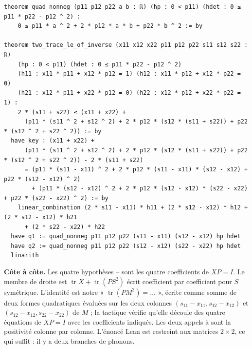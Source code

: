 \begin{leanbox}
\begin{lstlisting}[style=chIIIlean]
theorem quad_nonneg (p11 p12 p22 a b : ℝ) (hp : 0 < p11) (hdet : 0 ≤ p11 * p22 - p12 ^ 2) :
    0 ≤ p11 * a ^ 2 + 2 * p12 * a * b + p22 * b ^ 2 := by

theorem two_trace_le_of_inverse (x11 x12 x22 p11 p12 p22 s11 s12 s22 : ℝ)
    (hp : 0 < p11) (hdet : 0 ≤ p11 * p22 - p12 ^ 2)
    (h11 : x11 * p11 + x12 * p12 = 1) (h12 : x11 * p12 + x12 * p22 = 0)
    (h21 : x12 * p11 + x22 * p12 = 0) (h22 : x12 * p12 + x22 * p22 = 1) :
    2 * (s11 + s22) ≤ (x11 + x22) +
      (p11 * (s11 ^ 2 + s12 ^ 2) + 2 * p12 * (s12 * (s11 + s22)) + p22 * (s12 ^ 2 + s22 ^ 2)) := by
  have key : (x11 + x22) +
      (p11 * (s11 ^ 2 + s12 ^ 2) + 2 * p12 * (s12 * (s11 + s22)) + p22 * (s12 ^ 2 + s22 ^ 2)) - 2 * (s11 + s22)
      = (p11 * (s11 - x11) ^ 2 + 2 * p12 * (s11 - x11) * (s12 - x12) + p22 * (s12 - x12) ^ 2)
        + (p11 * (s12 - x12) ^ 2 + 2 * p12 * (s12 - x12) * (s22 - x22) + p22 * (s22 - x22) ^ 2) := by
    linear_combination (2 * s11 - x11) * h11 + (2 * s12 - x12) * h12 + (2 * s12 - x12) * h21
      + (2 * s22 - x22) * h22
  have q1 := quad_nonneg p11 p12 p22 (s11 - x11) (s12 - x12) hp hdet
  have q2 := quad_nonneg p11 p12 p22 (s12 - x12) (s22 - x22) hp hdet
  linarith
\end{lstlisting}
\end{leanbox}
\noindent \textbf{Côte à côte.} Les quatre hypothèses -- sont les quatre coefficients de $XP=I$. Le
membre de droite est $\operatorname{tr}X+\operatorname{tr}(PS^2)$ écrit coefficient par coefficient pour $S$ symétrique.
L'identité  est notre « $\operatorname{tr}(PM^2)=\dots$ », écrite comme somme de deux formes quadratiques
évaluées sur les deux colonnes $(s_{11}-x_{11},s_{12}-x_{12})$ et $(s_{12}-x_{12},s_{22}-x_{22})$ de $M$ ; la tactique
 vérifie qu'elle découle des quatre équations de $XP=I$ avec les coefficients indiqués. Les deux
appels à  sont la positivité colonne par colonne. L'énoncé Lean est restreint aux matrices
$2\times2$, ce qui suffit : il y a deux branches de phonons.

